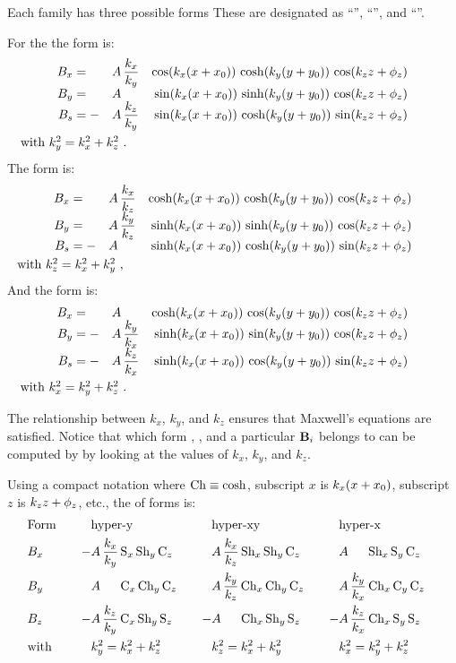Each family has three possible forms These are designated as ``'',
``'', and ``''. 

For the   the  form is:
\begin{alignat}{4}
  B_x &=  &A \, &\dfrac{k_x}{k_y} & \cos(\kxx) \, \cosh(\kyy) \, \cos(\kzz) \CRNEG
  B_y &=  &A \, &                 & \sin(\kxx) \, \sinh(\kyy) \, \cos(\kzz) \CRNEG
  B_s &= -&A \, &\dfrac{k_z}{k_y} & \sin(\kxx) \, \cosh(\kyy) \, \sin(\kzz) \label{cm1} \\
  & \makebox[1pt][L]{with $k_y^2 = k_x^2 + k_z^2$ .} &&& \nonumber
\end{alignat}
The    form is:
\begin{alignat}{4}
  B_x &=  &A \, &\dfrac{k_x}{k_z} & \cosh(\kxx) \, \cosh(\kyy) \, \cos(\kzz) \CRNEG
  B_y &=  &A \, &\dfrac{k_y}{k_z} & \sinh(\kxx) \, \sinh(\kyy) \, \cos(\kzz) \CRNEG
  B_s &= -&A \, &                 & \sinh(\kxx) \, \cosh(\kyy) \, \sin(\kzz) \label{cm3} \\
  & \makebox[1pt][L]{with $k_z^2 = k_x^2 + k_y^2$ ,} &&& \nonumber
\end{alignat}
And the    form is:
\begin{alignat}{4}
  B_x &=  &A \, &                 & \cosh(\kxx) \, \cos(\kyy) \, \cos(\kzz) \CRNEG
  B_y &= -&A \, &\dfrac{k_y}{k_x} & \sinh(\kxx) \, \sin(\kyy) \, \cos(\kzz) \CRNEG
  B_s &= -&A \, &\dfrac{k_z}{k_x} & \sinh(\kxx) \, \cos(\kyy) \, \sin(\kzz) \label{cm5} \\
  & \makebox[1pt][L]{with $k_x^2 = k_y^2 + k_z^2$ .} &&& \nonumber
\end{alignat}

The relationship between $k_x$, $k_y$, and $k_z$ ensures that
Maxwell's equations are satisfied. Notice that which form
, , and  a particular ${\bf B}_i$
belongs to can be computed by \bmad by looking at the values of $k_x$,
$k_y$, and $k_z$.

Using a compact notation where $\text{Ch} \equiv \cosh$, subscript $x$ is $k_x (x + x_0)$, subscript $z$
is $k_z z + \phi_z$, etc., the   of forms is:
\begin{alignat}{7}
  & \text{Form} \quad  && \text{hyper-y} \quad && \text{hyper-xy} \quad && \text{hyper-x} \quad \CRNO
  & B_x  
    &-& A \, \dfrac{k_x}{k_y} \, \Se_x \, \Sh_y \, \Ce_z \quad
    & & A \, \dfrac{k_x}{k_z} \, \Sh_x \, \Sh_y \, \Ce_z \quad
    & & A \, \hphphp          \, \Sh_x \, \Se_y \, \Ce_z \quad \CRNO
  & B_y
    & & A \, \hphphp          \, \Ce_x \, \Ch_y \, \Ce_z \quad
    & & A \, \dfrac{k_y}{k_z} \, \Ch_x \, \Ch_y \, \Ce_z \quad
    & & A \, \dfrac{k_y}{k_x} \, \Ch_x \, \Ce_y \, \Ce_z \quad \label{family.y} \\
  & B_z
    &-& A \, \dfrac{k_z}{k_y} \, \Ce_x \, \Sh_y \, \Se_z \quad
    &-& A \, \hphphp          \, \Ch_x \, \Sh_y \, \Se_z \quad
    &-& A \, \dfrac{k_z}{k_x} \, \Ch_x \, \Se_y \, \Se_z \quad \CRNO
  & \text{with} 
    && k_y^2 = k_x^2 + k_z^2 
    && k_z^2 = k_x^2 + k_y^2
    && k_x^2 = k_y^2 + k_z^2 \nonumber
\end{alignat}

